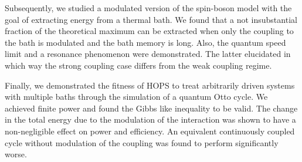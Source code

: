 Subsequently, we studied a modulated version of the spin-boson model
with the goal of extracting energy from a thermal bath. We found that
a not insubstantial fraction of the theoretical maximum can be
extracted when only the coupling to the bath is modulated and the bath
memory is long. Also, the quantum speed limit and a resonance
phenomenon were demonstrated. The latter elucidated in which way the
strong coupling case differs from the weak coupling regime.

Finally, we demonstrated the fitness of HOPS to treat arbitrarily
driven systems with multiple baths through the simulation of a quantum
Otto cycle. We achieved finite power and found the Gibbs like
inequality to be valid. The change in the total energy due to the
modulation of the interaction was shown to have a non-negligible
effect on power and efficiency. An equivalent continuously coupled
cycle without modulation of the coupling was found to perform
significantly worse.
